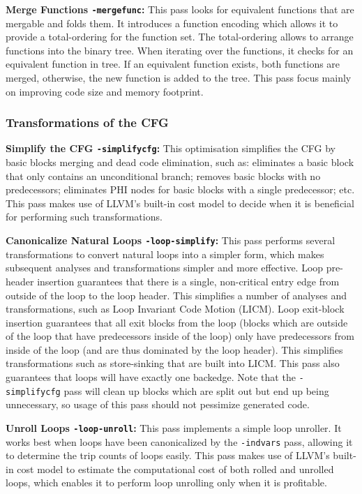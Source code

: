 \noindent\textbf{Merge Functions \texttt{-mergefunc}:}
This pass looks for equivalent functions that are mergable and folds them.
It introduces a function encoding which allows it to provide a total-ordering for the function set.
The total-ordering allows to arrange functions into the binary tree.
When iterating over the functions, it checks for an equivalent function in tree.
If an equivalent function exists, both functions are merged, otherwise, the new function is added to the tree.
This pass focus mainly on improving code size and memory footprint.

\subsubsection{Transformations of the CFG}

\noindent\textbf{Simplify the CFG \texttt{-simplifycfg}:}
This optimisation simplifies the CFG by basic blocks merging and dead code elimination, such as:
eliminates a basic block that only contains an unconditional branch;
removes basic blocks with no predecessors;
eliminates PHI nodes for basic blocks with a single predecessor; etc.
This pass makes use of LLVM's built-in cost model to decide when it is beneficial for performing such transformations.

\noindent\textbf{Canonicalize Natural Loops \texttt{-loop-simplify}:}
This pass performs several transformations to convert natural loops into a simpler form, which makes subsequent analyses and transformations simpler and more effective.
Loop pre-header insertion guarantees that there is a single, non-critical entry edge from outside of the loop to the loop header.
This simplifies a number of analyses and transformations, such as Loop Invariant Code Motion (LICM).
Loop exit-block insertion guarantees that all exit blocks from the loop (blocks which are outside of the loop that have predecessors inside of the loop) only have predecessors from inside of the loop (and are thus dominated by the loop header). This simplifies transformations such as store-sinking that are built into LICM.
This pass also guarantees that loops will have exactly one backedge.
Note that the \texttt{-simplifycfg} pass will clean up blocks which are split out but end up being unnecessary, so usage of this pass should not pessimize generated code.

\noindent\textbf{Unroll Loops \texttt{-loop-unroll}:}
This pass implements a simple loop unroller.
It works best when loops have been canonicalized by the \texttt{-indvars} pass, allowing it to determine the trip counts of loops easily.
This pass makes use of LLVM's built-in cost model to estimate the computational cost of both rolled and unrolled loops, which enables it to perform loop unrolling only when it is profitable.

